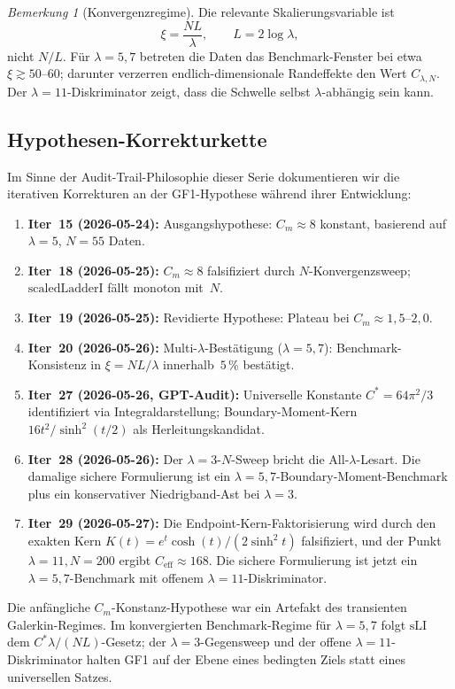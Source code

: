 ﻿\documentclass[12pt,a4paper]{article}
\theoremstyle{definition}
\theoremstyle{remark}
\newtheorem{remark}[theorem]{Bemerkung}
\begin{document}
\begin{remark}[Konvergenzregime]
\label{rem:NL-regime}
Die relevante Skalierungsvariable ist
\[
  \xi=\frac{NL}{\lambda},\qquad L=2\log\lambda,
\]
nicht $N/L$. Für $\lambda=5,7$ betreten die Daten das Benchmark-Fenster
bei etwa $\xi\gtrsim50$--$60$; darunter verzerren endlich-dimensionale
Randeffekte den Wert $C_{\lambda,N}$. Der $\lambda=11$-Diskriminator zeigt,
dass die Schwelle selbst $\lambda$-abhängig sein kann.
\end{remark}

\subsection{Hypothesen-Korrekturkette}
\label{sec:gf1-corrections}

Im Sinne der Audit-Trail-Philosophie dieser Serie dokumentieren wir die iterativen Korrekturen an der GF1-Hypothese während ihrer Entwicklung:
\begin{enumerate}
  \item \textbf{Iter~15 (2026-05-24):} Ausgangshypothese: $C_m \approx 8$ konstant, basierend auf $\lambda = 5$, $N = 55$ Daten.
  \item \textbf{Iter~18 (2026-05-25):} $C_m \approx 8$ falsifiziert durch $N$-Konvergenzsweep; $\mathrm{scaledLadderI}$ fällt monoton mit~$N$.
  \item \textbf{Iter~19 (2026-05-25):} Revidierte Hypothese: Plateau bei $C_m \approx 1{,}5$--$2{,}0$.
  \item \textbf{Iter~20 (2026-05-26):} Multi-$\lambda$-Bestätigung ($\lambda = 5, 7$): Benchmark-Konsistenz in $\xi=NL/\lambda$ innerhalb~$5\,\%$ bestätigt.
  \item \textbf{Iter~27 (2026-05-26, GPT-Audit):} Universelle Konstante $C^* = 64\pi^2/3$ identifiziert via Integraldarstellung; Boundary-Moment-Kern $16t^2/\sinh^2(t/2)$ als Herleitungskandidat.
  \item \textbf{Iter~28 (2026-05-26):} Der $\lambda=3$-$N$-Sweep bricht die All-$\lambda$-Lesart. Die damalige sichere Formulierung ist ein $\lambda=5,7$-Boundary-Moment-Benchmark plus ein konservativer Niedrigband-Ast bei $\lambda=3$.
  \item \textbf{Iter~29 (2026-05-27):} Die Endpoint-Kern-Faktorisierung wird durch den exakten Kern $K(t)=e^t\cosh(t)/(2\sinh^2t)$ falsifiziert, und der Punkt $\lambda=11,N=200$ ergibt $C_{\mathrm{eff}}\approx168$. Die sichere Formulierung ist jetzt ein $\lambda=5,7$-Benchmark mit offenem $\lambda=11$-Diskriminator.
\end{enumerate}
Die anfängliche $C_m$-Konstanz-Hypothese war ein Artefakt des transienten
Galerkin-Regimes. Im konvergierten Benchmark-Regime für $\lambda=5,7$
folgt $\mathrm{sLI}$ dem $C^*\lambda/(NL)$-Gesetz; der
$\lambda=3$-Gegensweep und der offene $\lambda=11$-Diskriminator halten
GF1 auf der Ebene eines bedingten Ziels statt eines universellen Satzes.
\end{document}
